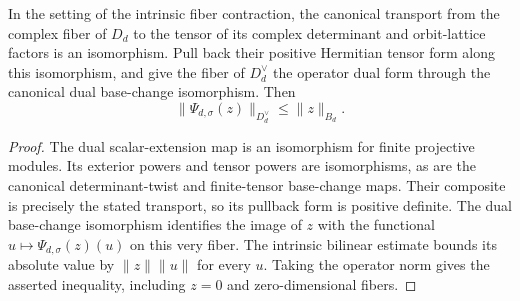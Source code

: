 \begin{lemma}
\label{lem:canonical-pairing-dual-norm}
\leanok
{}
In the setting of the intrinsic fiber contraction, the canonical transport
from the complex fiber of $D_d$ to the tensor of its complex determinant
and orbit-lattice factors is an isomorphism. Pull back their positive
Hermitian tensor form along this isomorphism, and give the fiber of
$D_d^\vee$ the operator dual form through the canonical dual base-change
isomorphism. Then
\[
 \|\Psi_{d,\sigma}(z)\|_{D_d^\vee}\leq\|z\|_{B_d}.
\]
\end{lemma}
\begin{proof}
The dual scalar-extension map is an isomorphism for finite projective
modules. Its exterior powers and tensor powers are isomorphisms, as are
the canonical determinant-twist and finite-tensor base-change maps.
Their composite is precisely the stated transport, so its pullback
form is positive definite. The dual base-change isomorphism identifies
the image of $z$ with the functional $u\mapsto\Psi_{d,\sigma}(z)(u)$
on this very fiber. The intrinsic bilinear estimate bounds its absolute
value by $\|z\|\|u\|$ for every $u$. Taking the operator norm gives
the asserted inequality, including $z=0$ and zero-dimensional fibers.
\end{proof}

